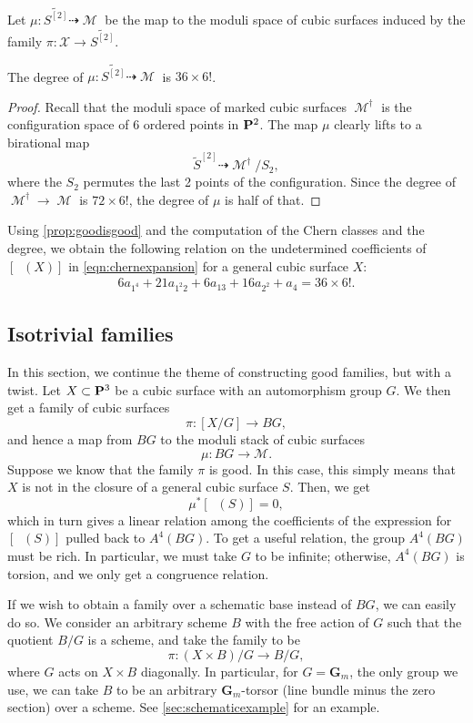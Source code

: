 \documentclass[reqno]{amsart}
\DeclareMathOperator{\Orb}{\overline{Orb}}
\DeclareMathOperator{\M}{\mathcal{M}}
\renewcommand{\to}{{\longrightarrow}}
\renewcommand {\P}{{\bf P}}
\numberwithin{equation}{section}
\newcommand{\G}{\mathbf{G}}
\begin{document}
Let $\mu \colon \widetilde{S^{[2]}} \dashrightarrow \M$ be the map to the moduli space of cubic surfaces induced by the family $\pi \colon \mathcal{X} \to \widetilde{S^{[2]}}$.
\begin{proposition}
  The degree of $\mu \colon \widetilde{S^{[2]}} \dashrightarrow \M$ is $36 \times 6!$.
\end{proposition}
\begin{proof}
  Recall that the moduli space of marked cubic surfaces $\M^{\dagger}$ is the configuration space of 6 ordered points in $\P^2$.
  The map $\mu$ clearly lifts to a birational map
  \[ \widetilde S^{[2]} \dashrightarrow \M^{\dagger} / S_2,\]
  where the $S_2$ permutes the last 2 points of the configuration.
  Since the degree of $\M^{\dagger} \to \M$ is  $72 \times 6!$, the degree of $\mu$ is half of that.
\end{proof}

Using \autoref{prop:goodisgood} and the computation of the Chern classes and the degree, we obtain the following relation on the undetermined coefficients of $[\Orb(X)]$ in
\eqref{eqn:chernexpansion} for a general cubic surface $X$:
\begin{align}
  \label{eq:relation4}
  6 a_{1^{4}} + 21 a_{1^{2}2} + 6a_{13} + 16a_{2^2}+  a_{4} = 36 \times 6!.
\end{align}

\subsection{Isotrivial families}
In this section, we continue the theme of constructing good families, but with a twist.
Let $X \subset \P^3$ be a cubic surface with an automorphism group $G$.
We then get a family of cubic surfaces
\[ \pi \colon [X/G] \to BG,\]
and hence a map from $BG$ to the moduli stack of cubic surfaces
\[ \mu \colon BG \to \mathscr{M}.\]
Suppose we know that the family $\pi$ is good.
In this case, this simply means that $X$ is not in the closure of a general cubic surface $S$.
Then, we get
\[ \mu^* [\Orb(S)] = 0,\]
which in turn gives a linear relation among the coefficients of the expression for $[\Orb(S)]$ pulled back to $A^4(BG)$.
To get a useful relation, the group $A^4(BG)$ must be rich.
In particular, we must take $G$ to be infinite; otherwise, $A^4(BG)$ is torsion, and we only get a congruence relation.

If we wish to obtain a family over a schematic base instead of $BG$, we can easily do so.
We consider an arbitrary scheme $B$ with the free action of $G$ such that the quotient $B/G$ is a scheme, and take the family to be
\[ \pi \colon (X \times B)/G \to B/G,\]
where $G$ acts on $X \times B$ diagonally.
In particular, for $G = \G_m$, the only group we use, we can take $B$ to be an arbitrary $\G_m$-torsor (line bundle minus the zero section) over a scheme.
See \autoref{sec:schematicexample} for an example.
\end{document}
